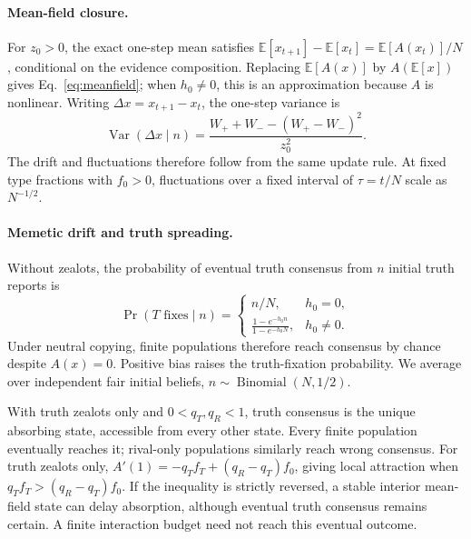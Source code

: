 \paragraph{Mean-field closure.}
For \(z_0>0\), the exact one-step mean satisfies
\(\mathbb E[x_{t+1}]-\mathbb E[x_t]=\mathbb E[A(x_t)]/N\), conditional on the evidence composition. Replacing \(\mathbb E[A(x)]\) by \(A(\mathbb E[x])\) gives Eq.~\eqref{eq:meanfield}; when \(h_0\ne0\), this is an approximation because \(A\) is nonlinear. Writing \(\Delta x=x_{t+1}-x_t\), the one-step variance is
\begin{equation}
 \operatorname{Var}(\Delta x\mid n)
 =\frac{W_++W_--(W_+-W_-)^2}{z_0^2}.
 \label{eq:update-variance}
\end{equation}
The drift and fluctuations therefore follow from the same update rule. At fixed type fractions with \(f_0>0\), fluctuations over a fixed interval of \(\tau=t/N\) scale as \(N^{-1/2}\).

\paragraph{Memetic drift and truth spreading.}
Without zealots, the probability of eventual truth consensus from \(n\) initial truth reports is
\begin{equation}
 \Pr(T\text{ fixes}\mid n)=
 \begin{cases}
 n/N,&h_0=0,\\[3pt]
 \displaystyle\frac{1-e^{-h_0n}}{1-e^{-h_0N}},&h_0\ne0.
 \end{cases}
 \label{eq:unanchored-fixation}
\end{equation}
Under neutral copying, finite populations therefore reach consensus by chance despite \(A(x)=0\). Positive bias raises the truth-fixation probability. We average over independent fair initial beliefs, \(n\sim\operatorname{Binomial}(N,1/2)\).

With truth zealots only and \(0<q_T,q_R<1\), truth consensus is the unique absorbing state, accessible from every other state. Every finite population eventually reaches it; rival-only populations similarly reach wrong consensus. For truth zealots only,
\(A'(1)=-q_Tf_T+(q_R-q_T)f_0\), giving local attraction when \(q_Tf_T>(q_R-q_T)f_0\). If the inequality is strictly reversed, a stable interior mean-field state can delay absorption, although eventual truth consensus remains certain. A finite interaction budget need not reach this eventual outcome.

